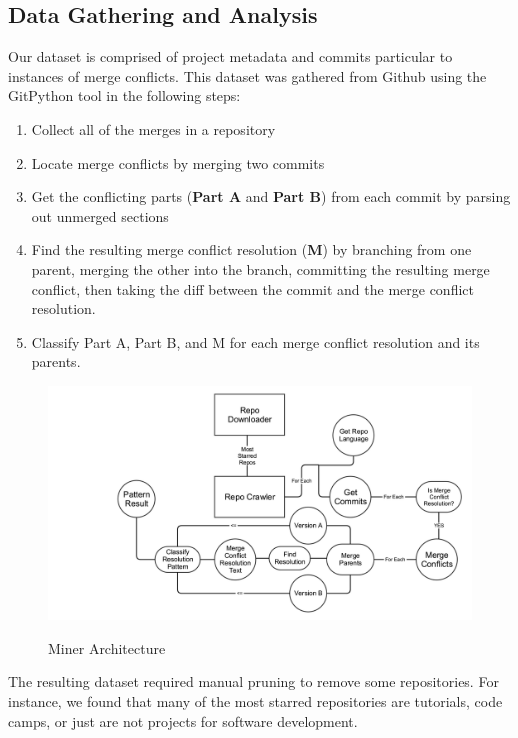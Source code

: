 \documentclass{sig-alternate-05-2015}
\begin{document}
\subsection{Data Gathering and Analysis}
Our dataset is comprised of project metadata and commits particular to instances of merge conflicts. This dataset was gathered from Github using the GitPython tool in the following steps:\\

\begin{enumerate}
\item Collect all of the merges in a repository
\item Locate merge conflicts by merging two commits
\item Get the conflicting parts (\textbf{Part A} and \textbf{Part B}) from each commit by parsing out unmerged sections
\item Find the resulting merge conflict resolution (\textbf{M}) by branching from one parent, merging the other into the branch, committing the resulting merge conflict, then taking the diff between the commit and the merge conflict resolution.
\item Classify Part A, Part B, and M for each merge conflict resolution and its parents.
\end{enumerate}

\begin{figure}[t]
\caption{Miner Architecture}
\includegraphics[width=\textwidth]{miningarchitecture}
\centering
\label{figure:f1}
\end{figure}

The resulting dataset required manual pruning to remove some repositories. For instance, we found that many of the most starred repositories are tutorials, code camps, or just are not projects for software development.
\end{document}
